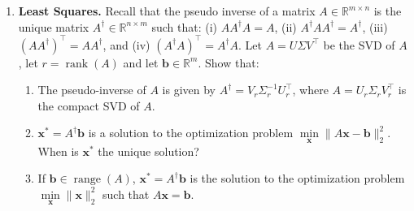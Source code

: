 \documentclass[10pt]{article}
\DeclareMathOperator*{\rank}{rank}
\DeclareMathOperator*{\range}{range}
\def\b{\boldsymbol{b}}
\def\x{\boldsymbol{x}}
\def\transpose{\top}
\renewcommand{\Re}{{\mathbb{R}}}
\begin{document}
\begin{enumerate}
\item \textbf{Least Squares.}
Recall that the pseudo inverse of a matrix $A\in\Re^{m\times n}$ is the unique matrix $A^\dag \in \Re^{n\times m}$ such that: (i) $AA^\dag A = A$, (ii) $A^\dag A A^\dag = A^\dag$, (iii) $(AA^\dag )^\transpose = AA^\dag$, and (iv) $(A^\dag A)^\transpose = A^\dag A$. Let $ A = U \Sigma V^\transpose$ be the SVD of $A$, let $r = \rank(A)$ and let $\b\in\Re^m$. 
Show that:

\begin{enumerate}
\item The pseudo-inverse of $A$ is given by $A^\dag = V_r \Sigma_r^{-1} U_r^\transpose$, where $A = U_r \Sigma_r V_r ^ \transpose$ is the compact SVD of $A$. 

\item $\x^* = A^\dag \b $ is a solution to the optimization problem $\min\limits_{\x} \| A \x - \b \|_2^2$. When is $\x^*$ the unique solution?

\item If $\b \in \range (A)$, $\x^* = A^\dag \b $ is the solution to the optimization problem $\min\limits_{\x} \| \x \|_2^2$ such that $A \x = \b$. 
\end{enumerate}



\end{enumerate}
\end{document}
